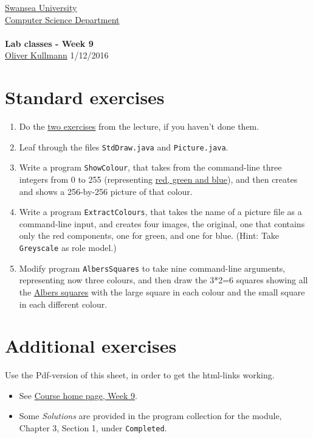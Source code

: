 \documentclass[11pt]{article}
\newcommand{\Java}{\lstset{language=Java,keywordstyle=\bfseries,breaklines,breakindent=30pt}}
\begin{document}
\begin{center}
  \href{http://www.swan.ac.uk/}{Swansea University}\\
  \href{http://www.swan.ac.uk/compsci/}{Computer Science Department}\\[1ex]
  \href{\chp}{\module}\\[1ex]
  \textbf{Lab classes - Week 9}\\
  \href{http://cs.swan.ac.uk/~csoliver}{Oliver Kullmann} 1/12/2016
\end{center}


\section{Standard exercises}
\label{sec:stdex}

\Java

\begin{enumerate}
\item Do the \href{\chp#PractiseLectureWeek09}{two exercises} from the lecture, if you haven't done them.
\item Leaf through the files \texttt{StdDraw.java} and \texttt{Picture.java}.
\item Write a program \texttt{ShowColour}, that takes from the command-line three integers from 0 to 255 (representing \href{http://en.wikipedia.org/wiki/RGB_color_model}{red, green and blue}), and then creates and shows a 256-by-256 picture of that colour.
\item Write a program \texttt{ExtractColours}, that takes the name of a picture file as a command-line input, and creates four images, the original, one that contains only the red components, one for green, and one for blue. (Hint: Take \texttt{Greyscale} as role model.)
\item Modify program \texttt{AlbersSquares} to take nine command-line arguments, representing now three colours, and then draw the 3*2=6 squares showing all the \href{http://en.wikipedia.org/wiki/Josef_Albers}{Albers squares} with the large square in each colour and the small square in each different colour.
\end{enumerate}


\section{Additional exercises}
\label{sec:addex}

Use the Pdf-version of this sheet, in order to get the html-links working.
\begin{itemize}
\item See \href{\chp#ExercisesWeek09}{Course home page, Week 9}.
\item Some \emph{Solutions} are provided in the program collection for the module, Chapter 3, Section 1, under \texttt{Completed}.
\end{itemize}
\end{document}
